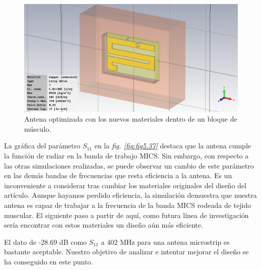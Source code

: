 \begin{figure}[!htb]
    \centering
    \includegraphics[scale=0.4]{./Simulaciones/optimized_antenna_muscle/optimized_muscle}
    \caption{Antena optimizada con los nuevos materiales dentro de un bloque de músculo.}
    \label{fig:fig5.36}
\end{figure}

La gráfica del parámetro $S_{11}$ en la \textit{fig. \ref{fig:fig5.37}} destaca que la antena cumple la función de radiar en la banda de trabajo MICS. Sin embargo, con respecto a las otras simulaciones realizadas, se puede observar un cambio de este parámetro en las demás bandas de frecuencias que resta eficiencia a la antena. Es un inconveniente a considerar tras cambiar los materiales originales del diseño del artículo. Aunque hayamos perdido eficiencia, la simulación demuestra que nuestra antena es capaz de trabajar a la frecuencia de la banda MICS rodeada de tejido muscular. El siguiente paso a partir de aquí, como futura línea de investigación sería encontrar con estos materiales un diseño aún más eficiente.

El dato de -28.69 dB como $S_{11}$ a 402 MHz para una antena microstrip es bastante aceptable. Nuestro objetivo de analizar e intentar mejorar el diseño se ha conseguido en este punto.


